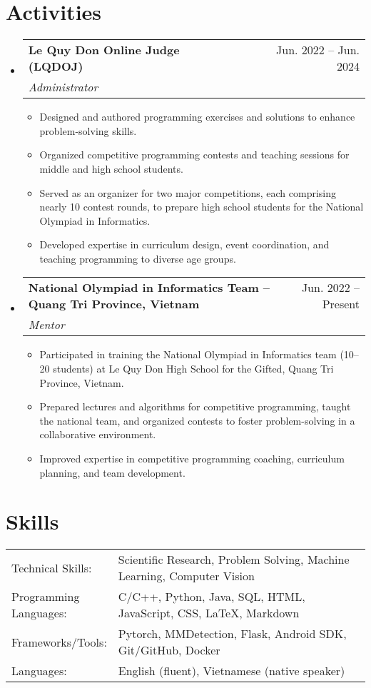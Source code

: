 \documentclass[letterpaper,11pt]{article}
\makeatletter
\newcommand{\resumeItem}[1]{
  \item\small{
    {#1 \vspace{-2pt}}
  }
}
\newcommand{\resumeSubhead}[3]{
  \vspace{-1pt}\item
    \begin{tabular*}{0.97\textwidth}{l@{\extracolsep{\fill}}r}
      \textbf{#1} & #2 \\
      \textit{\normalsize#3}
    \end{tabular*}\vspace{-5pt}
}
\newcommand{\resumeSubHeadingListStart}{\begin{itemize}[leftmargin=*]}
\newcommand{\resumeSubHeadingListEnd}{\end{itemize}}
\newcommand{\resumeItemListStart}{\begin{itemize}}
\newcommand{\resumeItemListEnd}{\end{itemize}\vspace{-5pt}}
\makeatother
\begin{document}
\section{Activities}
  \resumeSubHeadingListStart
    \resumeSubhead
      {Le Quy Don Online Judge (LQDOJ)}{Jun. 2022 -- Jun. 2024}
      {Administrator}
      \resumeItemListStart
        \resumeItem{Designed and authored programming exercises and solutions to enhance problem-solving skills.}
        \resumeItem{Organized competitive programming contests and teaching sessions for middle and high school students.}
        \resumeItem{Served as an organizer for two major competitions, each comprising nearly 10 contest rounds, to prepare high school students for the National Olympiad in Informatics.}
        \resumeItem{Developed expertise in curriculum design, event coordination, and teaching programming to diverse age groups.}
      \resumeItemListEnd

    \resumeSubhead
      {National Olympiad in Informatics Team -- Quang Tri Province, Vietnam}{Jun. 2022 -- Present}
      {Mentor}
      \resumeItemListStart
        \resumeItem{Participated in training the National Olympiad in Informatics team (10–20 students) at Le Quy Don High School for the Gifted, Quang Tri Province, Vietnam.}
        \resumeItem{Prepared lectures and algorithms for competitive programming, taught the national team, and organized contests to foster problem-solving in a collaborative environment.}
        \resumeItem{Improved expertise in competitive programming coaching, curriculum planning, and team development.}
      \resumeItemListEnd

  \resumeSubHeadingListEnd

\section{Skills}

\begin{table}[H]
    \centering
    \begin{tabular}{p{0.25\linewidth}p{0.75\linewidth}}
        Technical Skills: & Scientific Research, Problem Solving, Machine Learning, Computer Vision\\
        Programming Languages: & C/C++, Python, Java, SQL, HTML, JavaScript, CSS, LaTeX, Markdown\\
        Frameworks/Tools: & Pytorch, MMDetection, Flask, Android SDK, Git/GitHub, Docker\\
        Languages: & English (fluent), Vietnamese (native speaker)
    \end{tabular}
\end{table}


  
\end{document}
